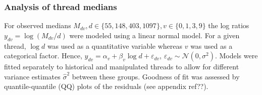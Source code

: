 \documentclass[9pt,a4paper,twocolumn,lineno]{article}
\begin{document}
\subsubsection*{Analysis of thread medians} For observed medians $M_{dv}, d\in \{55,148,403,1097\}, v \in \{0,1,3,9\}$ the log ratios $y_{dv} = \log (M_{dv}/d)$ were modeled using a linear normal model. For a given thread, $\log{d}$ was used as a quantitative variable whereas $v$ was used as a categorical factor. Hence, $y_{dv} = \alpha_v+\beta_v\log{d}+\varepsilon_{dv}$, $\varepsilon_{dv} \sim \mathcal{N}(0,\sigma^2)$. Models were fitted separately to historical and manipulated threads to allow for different variance estimates $\hat{\sigma}^2$ between these groups. Goodness of fit was assessed by quantile-quantile (QQ) plots of the residuals (see appendix ref??).
\end{document}
